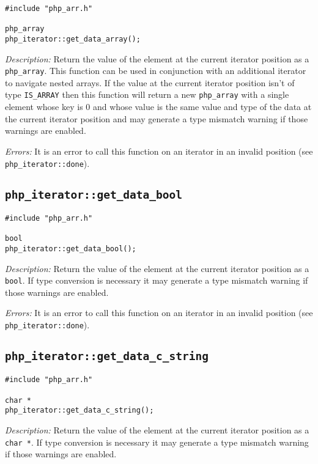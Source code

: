 \documentclass[11pt,titlepage]{article}
\begin{document}
\begin{verbatim}
#include "php_arr.h"

php_array 
php_iterator::get_data_array();
\end{verbatim}

\emph{Description:} Return the value of the element at the current iterator position as a \verb|php_array|. This function can be used in conjunction with an additional iterator to navigate nested arrays. If the value at the current iterator position isn't of type \verb|IS_ARRAY| then this function will return a new \verb|php_array| with a single element whose key is 0 and whose value is the same value and type of the data at the current iterator position and may generate a type mismatch warning if those warnings are enabled. 

\emph{Errors:} It is an error to call this function on an iterator in an invalid position (see \verb|php_iterator::done|).


\subsection{\texttt{php\_iterator::get\_data\_bool}}

\begin{verbatim}
#include "php_arr.h"

bool 
php_iterator::get_data_bool();
\end{verbatim}

\emph{Description:} Return the value of the element at the current iterator position as a \verb|bool|. If type conversion is necessary it may generate a type mismatch warning if those warnings are enabled.

\emph{Errors:} It is an error to call this function on an iterator in an invalid position (see \verb|php_iterator::done|).


\subsection{\texttt{php\_iterator::get\_data\_c\_string}}

\begin{verbatim}
#include "php_arr.h"

char *
php_iterator::get_data_c_string();
\end{verbatim}

\emph{Description:} Return the value of the element at the current iterator position as a \verb|char *|. If type conversion is necessary it may generate a type mismatch warning if those warnings are enabled.
\end{document}
